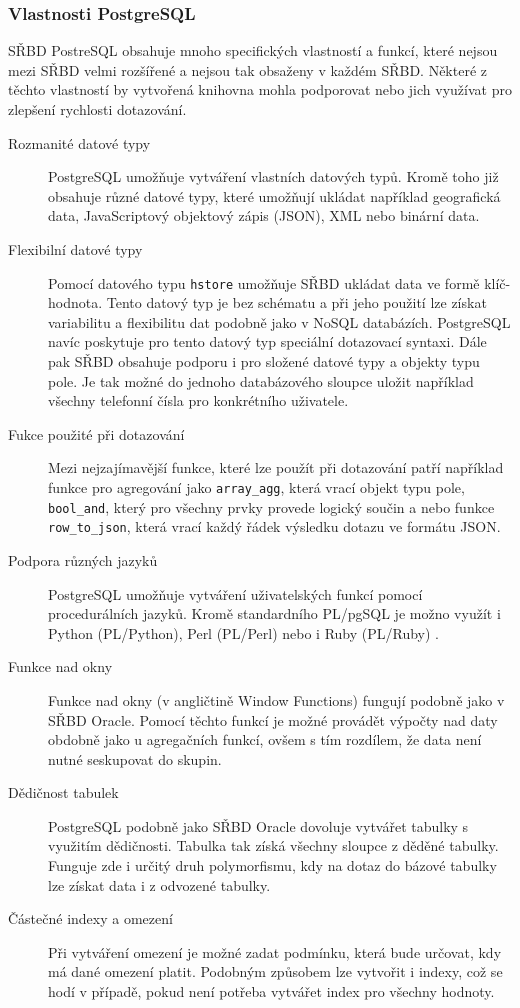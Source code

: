 \documentclass[ing,male,java,dept456]{diploma}						%
\begin{document}
\subsubsection{Vlastnosti PostgreSQL}
\label{subsubsec:PostgreSQL}

SŘBD PostreSQL obsahuje mnoho specifických vlastností a funkcí, které nejsou mezi SŘBD velmi rozšířené a nejsou tak obsaženy v každém SŘBD. Některé z těchto vlastností by vytvořená knihovna mohla podporovat nebo jich využívat pro zlepšení rychlosti dotazování.

\begin{description}
  \item[Rozmanité datové typy] PostgreSQL umožňuje vytváření vlastních datových typů. Kromě toho již obsahuje různé datové typy, které umožňují ukládat například geografická data, JavaScriptový objektový zápis (JSON), XML nebo binární data. 
  \item[Flexibilní datové typy] Pomocí datového typu \lstinline[style=inlinepython]|hstore| umožňuje SŘBD ukládat data ve formě klíč-hodnota. Tento datový typ je bez schématu a při jeho použití lze získat variabilitu a flexibilitu dat podobně jako v NoSQL databázích. PostgreSQL navíc poskytuje pro tento datový typ speciální dotazovací syntaxi. Dále pak SŘBD obsahuje podporu i pro složené datové typy a objekty typu pole. Je tak možné do jednoho databázového sloupce uložit například všechny telefonní čísla pro konkrétního uživatele. 
  \item[Fukce použité při dotazování] Mezi nejzajímavější funkce, které lze použít při dotazování patří například funkce pro agregování jako \lstinline[style=inlinepython]|array_agg|, která vrací objekt typu pole, \lstinline[style=inlinepython]|bool_and|, který pro všechny prvky provede logický součin a nebo funkce \lstinline[style=inlinepython]|row_to_json|, která vrací každý řádek výsledku dotazu ve formátu JSON.
  \item[Podpora různých jazyků] PostgreSQL umožňuje vytváření uživatelských funkcí pomocí procedurálních jazyků. Kromě standardního PL/pgSQL je možno využít i Python (PL/Python), Perl (PL/Perl) nebo i Ruby (PL/Ruby) \cite{pllanguages}. 
  \item[Funkce nad okny] Funkce nad okny (v angličtině Window Functions) fungují podobně jako v SŘBD Oracle. Pomocí těchto funkcí je možné provádět výpočty nad daty obdobně jako u agregačních funkcí, ovšem s tím rozdílem, že data není nutné seskupovat do skupin.
  \item[Dědičnost tabulek] PostgreSQL podobně jako SŘBD Oracle dovoluje vytvářet tabulky s využitím dědičnosti. Tabulka tak získá všechny sloupce z děděné tabulky. Funguje zde i určitý druh polymorfismu, kdy na dotaz do bázové tabulky lze získat data i z odvozené tabulky.
  \item[Částečné indexy a omezení] Při vytváření omezení je možné zadat podmínku, která bude určovat, kdy má dané omezení platit. Podobným způsobem lze vytvořit i indexy, což se hodí v případě, pokud není potřeba vytvářet index pro všechny hodnoty.
\end{description}
\end{document}
